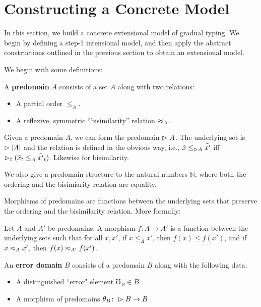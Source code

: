 \section{Constructing a Concrete Model}\label{sec:concrete-model}

In this section, we build a concrete extensional model of gradual typing.
We begin by defining a step-1 intensional model, and then
apply the abstract constructions outlined in the previous section
to obtain an extensional model.

We begin with some definitions:

\begin{definition}
A \textbf{predomain} $A$ consists of a set $A$ along with two relations:
\begin{itemize}
    \item A partial order $\le_A$.
    \item A reflexive, symmetric ``bisimilarity'' relation $\approx_A$.
\end{itemize}
\end{definition}

Given a predomain $A$, we can form the predomain $\vartriangleright A$.
The underlying set is $\vartriangleright |A|$ and the relation is defined in the obvious way,
i.e., $\tilde{x} \le_{\vartriangleright A} \tilde{x'}$ iff $\vartriangleright_t(\tilde{x}_t \le_A \tilde{x'}_t)$.
Likewise for bisimilarity.

We also give a predomain structure to the natural numbers $\mathbb{N}$, where both the
ordering and the bisimiarity relation are equality.

Morphisms of predomains are functions between the underlying sets that preserve the ordering
and the bisimilarity relation. More formally:
%
\begin{definition}
Let $A$ and $A'$ be predomains.
A morphism $f : A \to A'$ is a function between the underlying sets such that for all $x, x'$,
if $x \le_A x'$, then $f(x) \le f(x')$, and if $x \approx_A x'$, then $f(x) \approx_{A'} f(x')$.
\end{definition}

\begin{definition}
An \textbf{error domain} $B$ consists of a predomain $B$ along with the following data:
\begin{itemize}
    \item A distinguished ``error" element $\mho_B \in B$
    \item A morphism of predomains $\theta_B \colon \vartriangleright B \to B$
\end{itemize}
\end{definition}


